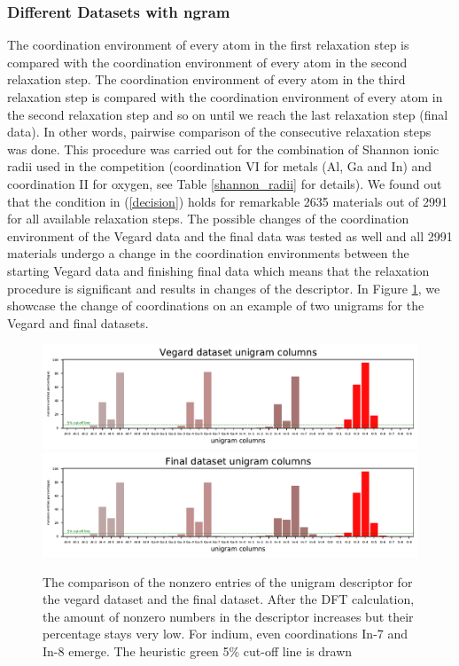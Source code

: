 \documentclass[11pt,oneside,czech,american]{book} %
\theoremstyle{definition} %
\theoremstyle{definition}
\begin{document}
\subsubsection{Different Datasets with ngram}
The coordination environment of every atom in the first relaxation step is compared with the coordination environment of every atom in the second relaxation step. The coordination environment of every atom in the third relaxation step is compared with the coordination environment of every atom in the second relaxation step and so on until we reach the last relaxation step (final data). In other words, pairwise comparison of the consecutive relaxation steps was done. This procedure was carried out for the combination of Shannon ionic radii used in the competition (coordination VI for metals (Al, Ga and In) and coordination II for oxygen, see Table \ref{shannon_radii} for details). We found out that the condition in (\ref{decision}) holds for remarkable 2635 materials out of 2991 for all available relaxation steps. The possible changes of the coordination environment of the Vegard data and the final data was tested as well and all 2991 materials undergo a change in the coordination environments between the starting Vegard data and finishing final data which means that the relaxation procedure is significant and results in changes of the descriptor. In Figure \ref{unigram_vegard_final}, we showcase the change of coordinations on an example of two unigrams for the Vegard and final datasets.
\begin{figure}[H]
	\centering
	\includegraphics[scale=0.8]{vegard_nonzero_unigram_competition.pdf}
	\includegraphics[scale=0.8]{final_nonzero_unigram_competition.pdf}
	\caption{The comparison of the nonzero entries of the unigram descriptor for the vegard dataset and the final dataset. After the DFT calculation, the amount of nonzero numbers in the descriptor increases but their percentage stays very low. For indium, even coordinations In-7 and In-8 emerge. The heuristic green 5\% cut-off line is drawn}
	\label{unigram_vegard_final}
\end{figure}
\end{document}

